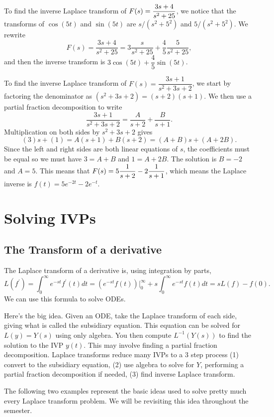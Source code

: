 \begin{example}
To find the inverse Laplace transform of $\displaystyle F(s) = \frac{3s+4}{s^2+25}$, we notice that the transforms of $\cos(5t)$ and $\sin(5t)$ are $s/(s^2+5^2)$ and $5/(s^2+5^2)$.  We rewrite $$F(s)  = \frac{3s+4}{s^2+25}= 3\frac{s}{s^2+25} +\frac{4}{5} \frac{5}{s^2+25},$$ and then the inverse transform is $3\cos(5t)+\dfrac{4}{5}\sin(5t)$.
\end{example}

\begin{example}
To find the inverse Laplace transform of $F(s) = \dfrac{3s+1}{s^2+3s+2}$, we start by factoring the denominator as $(s^2+3s+2) = (s+2)(s+1)$.  We then use a partial fraction decomposition to write $$\dfrac{3s+1}{s^2+3s+2} = \dfrac{A}{s+2}+\dfrac{B}{s+1}.$$ Multiplication on both sides by $s^2+3s+2$ gives $$(3)s+(1) = A(s+1)+B(s+2) = (A+B)s+(A+2B).$$  Since the left and right sides are both linear equations of $s$, the coefficients must be equal so we must have $3=A+B$ and $1=A+2B$. The solution is $B=-2$ and $A=5$.  This means that $\displaystyle F(s) = 5\frac{1}{s+2}-2\frac{1}{s+1}$, which means the Laplace inverse is $f(t) = 5e^{-2t}-2e^{-t}$.
\end{example}


\section{Solving IVPs}

\subsection{The Transform of a derivative}
The Laplace transform of a derivative is, using integration by parts, $$L(f^\prime)=\int_0^\infty e^{-st}f^\prime (t)dt = (e^{-st}f(t))\big|_0^\infty + s\int_0^\infty e^{-st}f (t)dt  = sL(f)-f(0).$$  We can use this formula to solve ODEs.

Here's the big idea. Given an ODE, take the Laplace transform of each side, giving what is called the subsidiary equation.  This equation can be solved for $L(y)=Y(s)$ using only algebra.  You then compute $L^{-1}(Y(s))$ to find the solution to the IVP $y(t)$.  This may involve finding a partial fraction decomposition. Laplace transforms reduce many IVPs to a 3 step process (1) convert to the subsidiary equation, (2) use algebra to solve for $Y$, performing a partial fraction decomposition if needed, (3) find inverse Laplace transform.

The following two examples represent the basic ideas used to solve pretty much every Laplace transform problem. We will be revisiting this idea throughout the semester.

